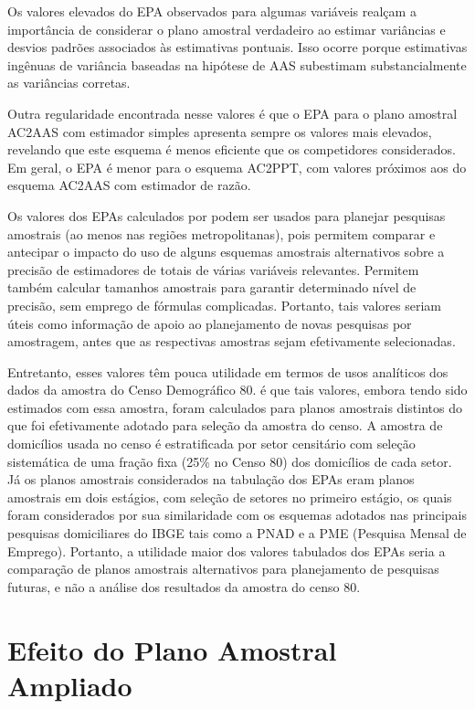 \documentclass[]{book}
\numberwithin{example}{chapter}
\numberwithin{remark}{chapter}
\numberwithin{definition}{chapter}
\begin{document}
Os valores elevados do EPA observados para algumas variáveis realçam a
importância de considerar o plano amostral verdadeiro ao estimar
variâncias e desvios padrões associados às estimativas pontuais. Isso
ocorre porque estimativas ingênuas de variância baseadas na hipótese de
AAS subestimam substancialmente as variâncias corretas.

Outra regularidade encontrada nesse valores é que o EPA para o plano
amostral AC2AAS com estimador simples apresenta sempre os valores mais
elevados, revelando que este esquema é menos eficiente que os
competidores considerados. Em geral, o EPA é menor para o esquema
AC2PPT, com valores próximos aos do esquema AC2AAS com estimador de
razão.

Os valores dos EPAs calculados por \citep{SilvaMou} podem ser usados
para planejar pesquisas amostrais (ao menos nas regiões metropolitanas),
pois permitem comparar e antecipar o impacto do uso de alguns esquemas
amostrais alternativos sobre a precisão de estimadores de totais de
várias variáveis relevantes. Permitem também calcular tamanhos amostrais
para garantir determinado nível de precisão, sem emprego de fórmulas
complicadas. Portanto, tais valores seriam úteis como informação de
apoio ao planejamento de novas pesquisas por amostragem, antes que as
respectivas amostras sejam efetivamente selecionadas.

Entretanto, esses valores têm pouca utilidade em termos de usos
analíticos dos dados da amostra do Censo Demográfico 80. é que tais
valores, embora tendo sido estimados com essa amostra, foram calculados
para planos amostrais distintos do que foi efetivamente adotado para
seleção da amostra do censo. A amostra de domicílios usada no censo é
estratificada por setor censitário com seleção sistemática de uma fração
fixa (25\% no Censo 80) dos domicílios de cada setor. Já os planos
amostrais considerados na tabulação dos EPAs eram planos amostrais em
dois estágios, com seleção de setores no primeiro estágio, os quais
foram considerados por sua similaridade com os esquemas adotados nas
principais pesquisas domiciliares do IBGE tais como a PNAD e a PME
(Pesquisa Mensal de Emprego). Portanto, a utilidade maior dos valores
tabulados dos EPAs seria a comparação de planos amostrais alternativos
para planejamento de pesquisas futuras, e não a análise dos resultados
da amostra do censo 80.

\section{Efeito do Plano Amostral
Ampliado}\label{efeito-do-plano-amostral-ampliado}
\end{document}
